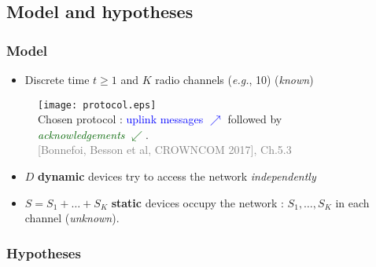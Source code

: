 \subsection{Model and hypotheses}

\subsubsection{Model}

\begin{frameO}[Model]

    \begin{itemize}
        \item
              Discrete time \(t\geq1\) and \(K\) radio channels (\emph{e.g.}, 10)
              \hfill{} (\emph{known})
    \end{itemize}

    \begin{figure}[h!]
        \centering
        \texttt{[image: protocol.eps]}\\
        {\small Chosen protocol : \textcolor{blue}{uplink messages $\nearrow$} followed by \textcolor{darkgreen}{\emph{acknowledgements} $\swarrow$}.}\\
        \hfill{} {\tiny \textcolor{gray}{[Bonnefoi, Besson et al, CROWNCOM 2017], Ch.5.3}}
    \end{figure}

    \begin{itemize}
        \item
              \(D\) \textbf{dynamic} devices try to access the network
              \emph{independently}
        \item
              \(S=S_1+\dots+S_{K}\) \textbf{static} devices occupy the network :
              \newline
              \(S_1,\dots,S_{K}\) in each channel \hfill{} (\emph{unknown}).
    \end{itemize}

\end{frameO}



\subsubsection{Hypotheses}

